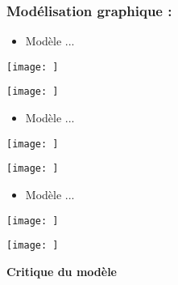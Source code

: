\documentclass[a4paper,12pt]{article}
\begin{document}
\subsubsection*{Modélisation graphique :} 
\begin{itemize}
    \item Modèle ...
\end{itemize}

\begin{center}
  \texttt{[image: ]}
  \end{center}
\begin{center}
  \texttt{[image: ]}
  \end{center}
\begin{itemize}
    \item Modèle ...
\end{itemize}


\begin{center}
  \texttt{[image: ]}
  \end{center}
\begin{center}
  \texttt{[image: ]}
  \end{center}
\begin{itemize}
    \item Modèle ...
\end{itemize}

\begin{center}
  \texttt{[image: ]}
  \end{center}
\begin{center}
  \texttt{[image: ]}
  \end{center}
\vspace{1cm}


\textbf{Critique du modèle}
\vspace{1cm}
\end{document}
